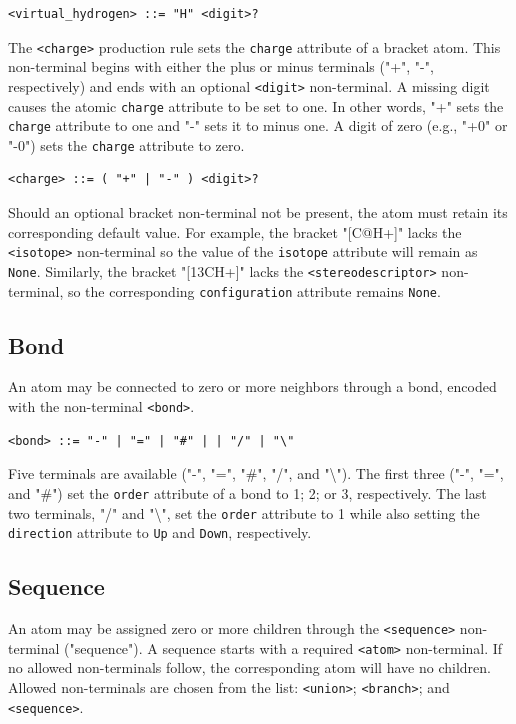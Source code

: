 \documentclass{article}
\def\ttt{\texttt}
\begin{document}
\begin{lstlisting}
<virtual_hydrogen> ::= "H" <digit>?
\end{lstlisting}

The \ttt{<charge>} production rule sets the \ttt{charge} attribute of a bracket atom. This non-terminal begins with either the plus or minus terminals ("+", "-", respectively) and ends with an optional \ttt{<digit>} non-terminal. A missing digit causes the atomic \ttt{charge} attribute to be set to one. In other words, "+" sets the \ttt{charge} attribute to one and "-" sets it to minus one. A digit of zero (e.g., "+0" or "-0") sets the \ttt{charge} attribute to zero.

\begin{lstlisting}
<charge> ::= ( "+" | "-" ) <digit>?
\end{lstlisting}

Should an optional bracket non-terminal not be present, the atom must retain its corresponding default value. For example, the bracket "[C@H+]" lacks the \ttt{<isotope>} non-terminal so the value of the \ttt{isotope} attribute will remain as \ttt{None}. Similarly, the bracket "[13CH+]" lacks the \ttt{<stereodescriptor>} non-terminal, so the corresponding \ttt{configuration} attribute remains \ttt{None}.

\subsection*{Bond}

An atom may be connected to zero or more neighbors through a bond, encoded with the non-terminal \ttt{<bond>}.

\begin{lstlisting}
<bond> ::= "-" | "=" | "#" | | "/" | "\"
\end{lstlisting}

Five terminals are available ("-", "=", "\#", "/", and "\textbackslash"). The first three ("-", "=", and "\#") set the \ttt{order} attribute of a bond to 1; 2; or 3, respectively. The last two terminals, "/" and "\textbackslash", set the \ttt{order} attribute to 1 while also setting the \ttt{direction} attribute to \ttt{Up} and \ttt{Down}, respectively.

\subsection*{Sequence}

An atom may be assigned zero or more children through the \ttt{<sequence>} non-terminal ("sequence"). A sequence starts with a required \ttt{<atom>} non-terminal. If no allowed non-terminals follow, the corresponding atom will have no children. Allowed non-terminals are chosen from the list: \ttt{<union>}; \ttt{<branch>}; and \ttt{<sequence>}.
\end{document}
